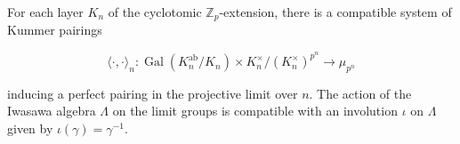For each layer $K_n$ of the cyclotomic $\mathbb{Z}_p$-extension, there is a compatible system of Kummer pairings

$$\langle \cdot, \cdot \rangle_n: \operatorname{Gal}(K_n^{\text{ab}}/K_n) \times K_n^{\times}/(K_n^{\times})^{p^n} \to \mu_{p^n}$$

inducing a perfect pairing in the projective limit over $n$. The action of the Iwasawa algebra $\Lambda$ on the limit groups is compatible with an involution $\iota$ on $\Lambda$ given by $\iota(\gamma) = \gamma^{-1}$.
